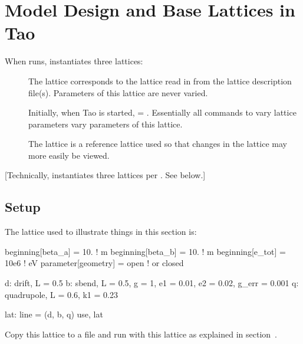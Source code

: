 \documentclass{hitec}
\newcommand{\Section}[1]{\section{#1}\vspace*{-1ex}}
\begin{document}
\newpage

\Section{Model Design and Base Lattices in Tao}

When \tao runs, \tao instantiates three lattices:
\begin{description}
\item[] \Newline
The  lattice corresponds to the lattice read in from the lattice
description file(s). Parameters of this lattice are never varied.
\item[] \Newline
Initially, when Tao is started,  = . Essentially all commands to vary lattice
parameters vary parameters of this lattice.
\item[] \Newline
The  lattice is a reference lattice used so that changes in the  
lattice may more easily be viewed.
\end{description}

[Technically, \tao instantiates three lattices per . See below.]

\subsection{Setup}

The lattice used to illustrate things in this section is:
{\small
\begin{code}
beginning[beta_a] = 10.   ! m
beginning[beta_b] = 10.   ! m
beginning[e_tot] = 10e6   ! eV
parameter[geometry] = open  ! or closed

d: drift, L = 0.5
b: sbend, L = 0.5, g = 1, e1 = 0.01, e2 = 0.02, g_err = 0.001
q: quadrupole, L = 0.6, k1 = 0.23

lat: line = (d, b, q)
use, lat
\end{code}}

Copy this lattice to a file and run \tao with this lattice as explained in section~.
\end{document}
